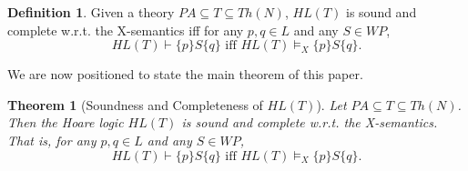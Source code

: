 \documentclass[a4paper,11pt]{article}
\begin{document}
\theoremstyle{definition}
\newtheorem{soundness_and_completeness_of_Hoare_logic}[satisfiability_of_asserted_programs_in_models]{Definition}
\begin{soundness_and_completeness_of_Hoare_logic}
Given a theory $PA\subseteq T\subseteq Th(N)$, $HL(T)$ is sound and complete w.r.t. the X-semantics iff for any $p,q\in L$ and any $S\in WP$,
\begin{equation*}
HL(T)\vdash \{p\} S \{q\} \mbox{\ iff \ } HL(T)\models_X \{p\} S \{q\}.
\end{equation*}
\end{soundness_and_completeness_of_Hoare_logic}

We are now positioned to state the main theorem of this paper.

\theoremstyle{plain}
\newtheorem{soundness_and_completeness_theorem}[satisfiability_of_asserted_programs_in_models]{Theorem}
\begin{soundness_and_completeness_theorem}[Soundness and Completeness of $HL(T)$]\label{soundness_and_completeness_theorem}
Let $PA\subseteq T \subseteq Th(N)$. Then the Hoare logic $HL(T)$ is sound and complete w.r.t. the X-semantics. That is, for any $p,q\in L$ and any $S\in WP$,
\begin{equation*}
HL(T)\vdash \{p\} S \{q\} \mbox{\ iff \ } HL(T)\models_X \{p\} S \{q\}.
\end{equation*}
\end{soundness_and_completeness_theorem}
\end{document}
